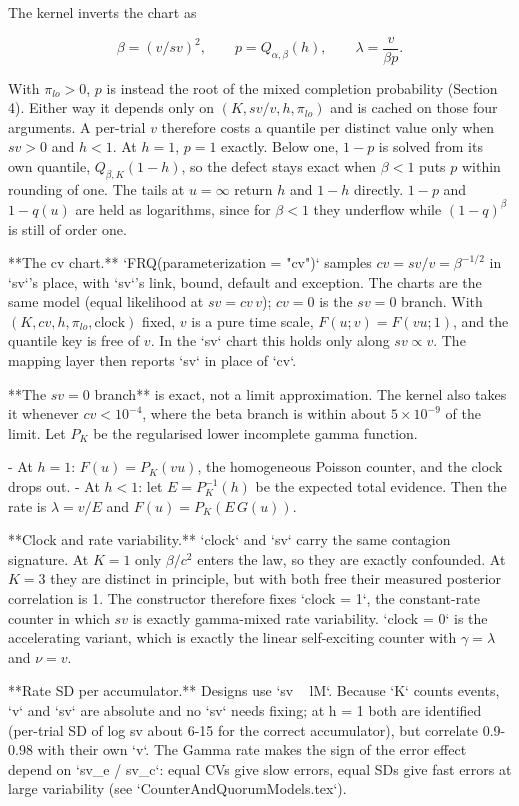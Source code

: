 The kernel inverts the chart as

\[
  \beta=(v/sv)^{2},\qquad p=Q_{\alpha,\beta}(h),
  \qquad \lambda=\frac{v}{\beta p}.
\]

With \(\pi_{lo}>0\), \(p\) is instead the root of the mixed completion
probability (Section 4). Either way it depends only on \((K,sv/v,h,\pi_{lo})\)
and is cached on those
four arguments. A per-trial \(v\) therefore costs a quantile per distinct value
only when \(sv>0\) and \(h<1\). At \(h=1\), \(p=1\) exactly. Below one, \(1-p\)
is solved from its own quantile, \(Q_{\beta,K}(1-h)\), so the
defect stays exact when \(\beta<1\) puts \(p\) within rounding of one. The
tails at \(u=\infty\) return \(h\) and \(1-h\) directly. \(1-p\) and
\(1-q(u)\) are held as logarithms, since for \(\beta<1\) they underflow while
\((1-q)^\beta\) is still of order one.

**The cv chart.** `FRQ(parameterization = "cv")` samples
\(cv=sv/v=\beta^{-1/2}\) in `sv`'s place, with `sv`'s link, bound, default
and exception. The charts are the same model (equal likelihood at
\(sv=cv\,v\)); \(cv=0\) is the \(sv=0\) branch. With
\((K,cv,h,\pi_{lo},\mathrm{clock})\) fixed, \(v\) is a pure time scale,
\(F(u;v)=F(vu;1)\), and the quantile key is free of \(v\). In the `sv`
chart this holds only along \(sv\propto v\). The mapping layer then reports
`sv` in place of `cv`.

**The \(sv=0\) branch** is exact, not a limit approximation. The kernel also
takes it whenever \(cv<10^{-4}\), where the beta branch is within about
\(5\times10^{-9}\) of the limit. Let \(P_K\) be
the regularised lower incomplete gamma function.

- At \(h=1\): \(F(u)=P_K(vu)\), the homogeneous Poisson counter, and the
  clock drops out.
- At \(h<1\): let \(E=P_K^{-1}(h)\) be the expected total
  evidence. Then the rate is \(\lambda=v/E\) and \(F(u)=P_K(E\,G(u))\).

**Clock and rate variability.** `clock` and `sv` carry the same contagion
signature. At \(K=1\) only \(\beta/c^2\) enters the law, so they are exactly
confounded. At \(K=3\) they are distinct in principle, but with both free their
measured posterior correlation is 1. The constructor therefore fixes `clock = 1`, the constant-rate counter in which
\(sv\) is exactly gamma-mixed rate variability. `clock = 0` is the
accelerating variant, which is exactly the linear self-exciting counter with
\(\gamma=\lambda\) and \(\nu=v\).

**Rate SD per accumulator.** Designs use `sv ~ lM`. Because `K` counts
events, `v` and `sv` are absolute and no `sv` needs fixing; at h = 1 both are
identified (per-trial SD of log sv about 6-15 for the correct accumulator), but
correlate 0.9-0.98 with their own `v`. The Gamma rate makes the sign of the
error effect depend on `sv_e / sv_c`: equal CVs give slow errors, equal SDs
give fast errors at large variability (see `CounterAndQuorumModels.tex`).


